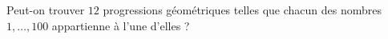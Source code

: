 Peut-on trouver $12$ progressions géométriques telles que chacun des nombres $1, \ldots, 100$ appartienne à l'une d'elles ?
